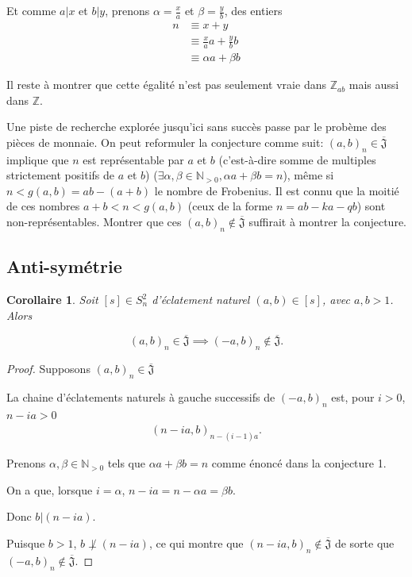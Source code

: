 \documentclass{article}
\newtheorem{corollary}{Corollaire}
\newcommand{\J}{\mathfrak{J}}
\newcommand{\JS}{\overline{\J}}
\begin{document}
Et comme $a \vert x$ et $b \vert y$, prenons $\alpha = \frac{x}{a}$ et $\beta = \frac{y}{b}$, des entiers
\begin{align*}
    n & \equiv x + y \\
        & \equiv \frac{x}{a}a + \frac{y}{b}b \\
        & \equiv \alpha a + \beta b
\end{align*}

Il reste à montrer que cette égalité n'est pas seulement vraie dans $\mathbb{Z}_{ab}$ mais aussi dans $\mathbb{Z}$.

Une piste de recherche explorée jusqu'ici sans succès passe par le probème des pièces de monnaie. 
On peut reformuler la conjecture comme suit: ${(a, b)}_n \in \JS$ implique que $n$ est représentable 
par $a$ et $b$ (c'est-à-dire somme de multiples strictement positifs de $a$ et $b$) 
($\exists \alpha, \beta \in \mathbb{N}_{>0}, \alpha a + \beta b = n$), même si $n < g(a, b) = ab - (a + b)$ le nombre de Frobenius\cite[page 134]{sylvester1882}.
Il est connu que la moitié de ces nombres $a + b < n < g(a, b)$ (ceux de la forme $n = ab - ka - qb$) sont non-représentables.
Montrer que ces ${(a, b)}_n \not \in \JS$ suffirait à montrer la conjecture.

\subsection{Anti-symétrie}

\begin{corollary}
    Soit $[s] \in S_n^2$ d'éclatement naturel $(a, b) \in [s]$, avec $a, b > 1$. Alors

    \[ {(a, b)}_n \in \JS \implies {(-a, b)}_n \not \in \JS. \]
\end{corollary}

\begin{proof}
    Supposons ${(a, b)}_n \in \JS$

    La chaine d'éclatements naturels à gauche successifs de ${(-a, b)}_n$ est, pour $i > 0$, $n - ia > 0$
    \begin{align*}
        {(n - ia, b)}_{n-(i-1)a}.
    \end{align*}

    Prenons $\alpha, \beta \in \mathbb{N}_{>0}$ tels que $\alpha a + \beta b = n$ comme énoncé dans la conjecture 1.

    On a que, lorsque $i = \alpha$, $n - ia = n - \alpha a = \beta b$.

    Donc $b \vert (n - ia)$. 
    
    Puisque $b > 1$, $b \not \perp (n - ia)$, ce qui montre que ${(n - ia, b)}_n \not \in \JS$ de sorte que ${(-a, b)}_n \not \in \JS$.
\end{proof}
\end{document}
